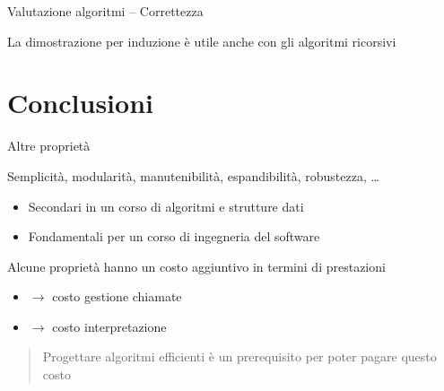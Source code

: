 \begin{frame}[shrink=7]{Valutazione algoritmi -- Correttezza}

\vspace{-9pt}
\begin{mybox}
La dimostrazione per induzione è utile anche con gli algoritmi ricorsivi
\end{mybox}

\vspace{-12pt}

\end{frame}


\section{Conclusioni}

\begin{frame}{Altre proprietà}

Semplicità, modularità, manutenibilità, espandibilità, robustezza, \ldots
\begin{itemize}
\item Secondari in un corso di algoritmi e strutture dati
\item Fondamentali per un corso di ingegneria del software
\end{itemize}

\medskip
\begin{myboxtitle}[Commento]
Alcune proprietà hanno un costo aggiuntivo in termini di prestazioni
\begin{itemize}
\item {} $\rightarrow$ costo gestione chiamate
\item {} $\rightarrow$ costo interpretazione
\end{itemize}
\begin{quote}
Progettare algoritmi efficienti è un prerequisito per poter pagare questo costo
\end{quote}
\end{myboxtitle}	
	
\end{frame}

